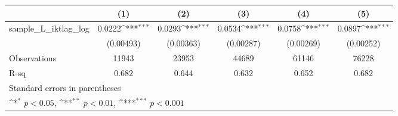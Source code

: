 {
\def\sym#1{\ifmmode^{#1}\else\(^{#1}\)\fi}
\begin{tabular}{l*{5}{c}}
\hline\hline
                &\multicolumn{1}{c}{(1)}         &\multicolumn{1}{c}{(2)}         &\multicolumn{1}{c}{(3)}         &\multicolumn{1}{c}{(4)}         &\multicolumn{1}{c}{(5)}         \\
\hline
sample\_L\_iktlag\_log&   0.0222\sym{***}&   0.0293\sym{***}&   0.0534\sym{***}&   0.0758\sym{***}&   0.0897\sym{***}\\
                &(0.00493)         &(0.00363)         &(0.00287)         &(0.00269)         &(0.00252)         \\
\hline
Observations    &    11943         &    23953         &    44689         &    61146         &    76228         \\
R-sq            &    0.682         &    0.644         &    0.632         &    0.652         &    0.682         \\
\hline\hline
\multicolumn{6}{l}{\footnotesize Standard errors in parentheses}\\
\multicolumn{6}{l}{\footnotesize \sym{*} \(p<0.05\), \sym{**} \(p<0.01\), \sym{***} \(p<0.001\)}\\
\end{tabular}
}
